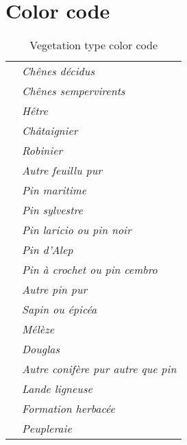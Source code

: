 
\chapter{Color code} %

\label{AppendixA} %

\begin{table}
\begin{center}
\begin{tabular}{l l}
\p[l1] & {\textit{Chênes décidus}} \\
\p[l2] & {\textit{Chênes sempervirents}} \\
\p[l3] & {\textit{Hêtre}} \\
\p[l4] & {\textit{Châtaignier}} \\
\p[l5] & {\textit{Robinier}} \\
\p[l6] & {\textit{Autre feuillu pur}} \\
\p[l7] & {\textit{Pin maritime}} \\
\p[l8] & {\textit{Pin sylvestre}} \\
\p[l9] & {\textit{Pin laricio ou pin noir}} \\
\p[l10] & {\textit{Pin d'Alep}} \\
\p[l11] & {\textit{Pin à crochet ou pin cembro}} \\
\p[l12] & {\textit{Autre pin pur}} \\
\p[l13] & {\textit{Sapin ou épicéa}} \\
\p[l14] & {\textit{Mélèze}} \\
\p[l15] & {\textit{Douglas}} \\
\p[l16] & {\textit{Autre conifère pur autre que pin}} \\
\p[l17] & {\textit{Lande ligneuse}} \\
\p[l18] & {\textit{Formation herbacée}} \\
\p[l19] & {\textit{Peupleraie}} \\
\end{tabular}
\end{center}
\caption{Vegetation type color code}
\end{table}